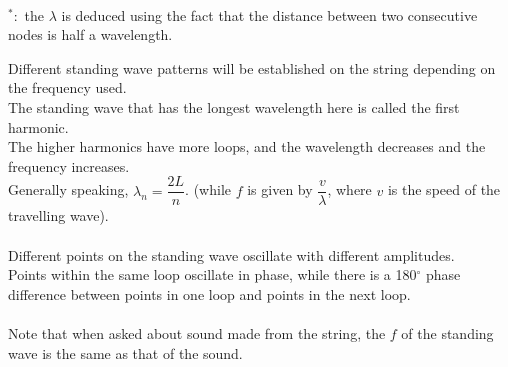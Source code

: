 \documentclass[a4paper,12pt]{article}
\begin{document}
\begin{center}
\\
$^*:$ the $\lambda$ is deduced using the fact that the distance between two consecutive nodes is half a wavelength.
\end{center}
Different standing wave patterns will be
established on the string depending on the frequency used. \\
The standing wave that has the longest wavelength here is called the first harmonic.\\
The higher harmonics have more loops, and the wavelength decreases and the frequency increases.\\
Generally speaking, $\lambda_n=\dfrac{2L}{n}$. (while $f$ is given by $\dfrac{v}{\lambda}$, where $v$ is the speed of the travelling wave).\\\\
Different points on the standing wave oscillate with different amplitudes. \\
Points within the same loop oscillate in phase, while there is a 180$^\circ$ phase difference between points in one loop and points in the next loop.\\\\
Note that when asked about sound made from the string, the $f$ of the standing wave is the same as that of the sound.
\end{document}
